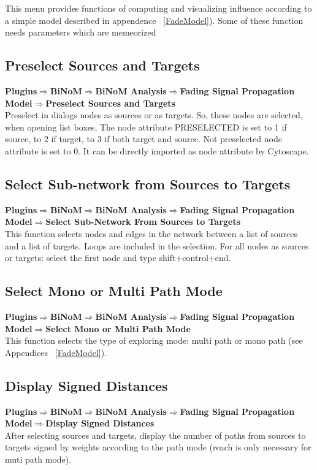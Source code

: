 This menu provides functions of computing and visualizing influence according to a simple model described in appendence ~\ref{FadeModel}). Some of these function needs parameters which are memeorized

\subsection{Preselect Sources and Targets}
\textbf{Plugins$\Rightarrow$BiNoM$\Rightarrow$BiNoM Analysis$\Rightarrow$Fading Signal Propagation Model$\Rightarrow$Preselect Sources and Targets}\\
Preselect in dialogs nodes as sources or as targets. So, these nodes are selected, when opening list boxes, The node attribute PRESELECTED is set to 1 if source, to 2 if target, to 3 if both target and source. Not preselected node attribute is set to 0. It can be directly imported as node attribute by Cytoscape.

\subsection{Select Sub-network from Sources to Targets}
\textbf{Plugins$\Rightarrow$BiNoM$\Rightarrow$BiNoM Analysis$\Rightarrow$Fading Signal Propagation Model$\Rightarrow$Select Sub-Network From Sources to Targets}\\
This function selects nodes and edges in the network between a list of sources and a list of targets.  Loops are included in the selection. For all nodes as sources or targets: select the first node and type shift+control+end.

\subsection{Select Mono or Multi Path Mode}
\textbf{Plugins$\Rightarrow$BiNoM$\Rightarrow$BiNoM Analysis$\Rightarrow$Fading Signal Propagation Model$\Rightarrow$Select Mono or Multi Path Mode}\\
This function selects the type of exploring mode: multi path or mono path (see Appendices ~\ref{FadeModel}).

\subsection{Display Signed Distances}
\textbf{Plugins$\Rightarrow$BiNoM$\Rightarrow$BiNoM Analysis$\Rightarrow$Fading Signal Propagation Model$\Rightarrow$Display Signed Distances}\\
After selecting sources and targets, display the number of paths from sources to targets signed by weights according to the path mode (reach is only necessary for muti path mode).

